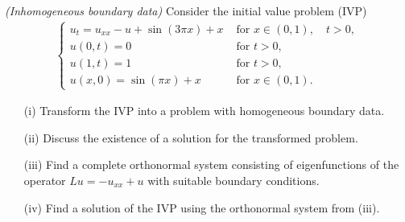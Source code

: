 
\begin{exercise}

\phantom{}
\textit{(Inhomogeneous boundary data)} Consider the initial value problem (IVP)
\begin{align*}
  \left\{\begin{array}{ll}
  u_{t}=u_{x x}-u+\sin (3 \pi x)+x & \text { for } x \in(0,1), \quad t>0, \\
  u(0, t)=0 & \text { for } t>0, \\
  u(1, t)=1 & \text { for } t>0, \\
  u(x, 0)=\sin (\pi x)+x & \text { for } x \in(0,1).
  \end{array}\right.
\end{align*}

\begin{itemize}
  \item[(i)] Transform the IVP into a problem with homogeneous boundary data.
  \item[(ii)] Discuss the existence of a solution for the transformed problem.
  \item[(iii)] Find a complete orthonormal system consisting of eigenfunctions of the operator $L u=-u_{x x}+u$ with suitable boundary conditions.
  \item[(iv)] Find a solution of the IVP using the orthonormal system from (iii).
\end{itemize}

\end{exercise}


